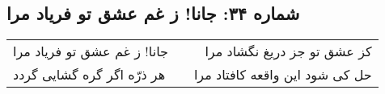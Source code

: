 \begin{center}
\section*{شماره ۳۴: جانا! ز غم عشق تو فریاد مرا}
\label{sec:034}
\begin{longtable}{l p{0.5cm} r}
جانا! ز غم عشق تو فریاد مرا
&&
کز عشق تو جز دریغ نگشاد مرا
\\
هر ذرّه اگر گره گشایی گردد
&&
حل کی شود این واقعه کافتاد مرا
\\
\end{longtable}
\end{center}
